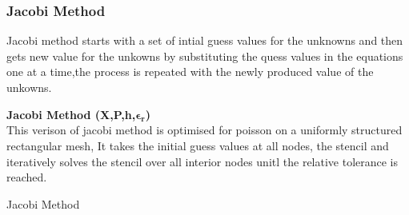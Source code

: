 \subsubsection{Jacobi Method}
Jacobi method starts with a set of intial guess values for the unknowns and then gets new value for the unkowns by substituting the quess values in the equations one at a time,the process is repeated with the newly produced value of the unkowns.\\[2mm]
\begin{algorithm}[H]
    \textbf{Jacobi Method (X,P,h,$\mathbf{\epsilon_r}$)}\\[-1pt]  
    This verison of jacobi method is optimised for poisson on a uniformly structured rectangular mesh, It takes the initial guess values at all nodes, the stencil and iteratively solves the stencil over all interior nodes unitl the relative tolerance is reached.  \\[2mm]
    \caption{Jacobi Method}
\end{algorithm}


